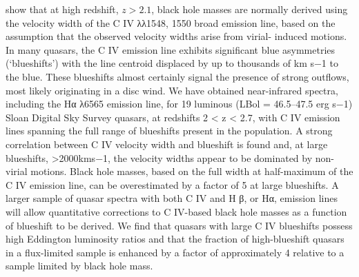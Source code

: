 \documentclass[a4paper,fleqn,usenatbib]{mnras}
\begin{document}
\citet{Coatman2016} show that %
at high redshift, $z>2.1$, black hole masses are normally derived using the velocity width of the C IV λλ1548, 1550 broad emission line, based on the assumption that the observed velocity widths arise from virial- induced motions. In many quasars, the C IV emission line exhibits significant blue asymmetries (‘blueshifts’) with the line centroid displaced by up to thousands of km s−1 to the blue. These blueshifts almost certainly signal the presence of strong outflows, most likely originating in a disc wind. We have obtained near-infrared spectra, including the Hα λ6565 emission line, for 19 luminous (LBol = 46.5–47.5 erg s−1) Sloan Digital Sky Survey quasars, at redshifts 2 < z < 2.7, with C IV emission lines spanning the full range of blueshifts present in the population. A strong correlation between C IV velocity width and blueshift is found and, at large blueshifts, >2000kms−1, the velocity widths appear to be dominated by non-virial motions. Black hole masses, based on the full width at half-maximum of the C IV emission line, can be overestimated by a factor of 5 at large blueshifts. A larger sample of quasar spectra with both C IV and H β, or Hα, emission lines will allow quantitative corrections to C IV-based black hole masses as a function of blueshift to be derived. We find that quasars with large C IV blueshifts possess high Eddington luminosity ratios and that the fraction of high-blueshift quasars in a flux-limited sample is enhanced by a factor of approximately 4 relative to a sample limited by black hole mass.
\end{document}
